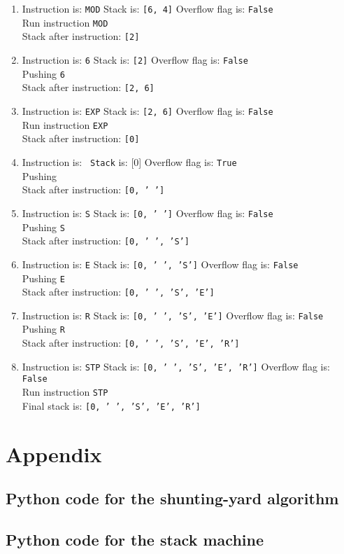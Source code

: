 \begin{enumerate}
\item Instruction is: \texttt{MOD} Stack is: \texttt{[6, 4]} Overflow flag is: \texttt{False}\\
	Run instruction \texttt{MOD}\\
	Stack after instruction:  \texttt{[2]}
\item Instruction is: \texttt{6} Stack is: \texttt{[2]} Overflow flag is: \texttt{False}\\
	Pushing \texttt{6}\\
	Stack after instruction:  \texttt{[2, 6]}
\item Instruction is: \texttt{EXP} Stack is: \texttt{[2, 6]} Overflow flag is: \texttt{False}\\
	Run instruction \texttt{EXP}\\
	Stack after instruction:  \texttt{[0]}
\item Instruction is: \texttt{  Stack} is: [0]\texttt{} Overflow flag is: \texttt{True}\\
	Pushing \texttt{ }\\
	Stack after instruction:  \texttt{[0, ' ']}
\item Instruction is: \texttt{S} Stack is: \texttt{[0, ' ']} Overflow flag is: \texttt{False}\\
	Pushing \texttt{S}\\
	Stack after instruction:  \texttt{[0, ' ', 'S']}
\item Instruction is: \texttt{E} Stack is: \texttt{[0, ' ', 'S']} Overflow flag is: \texttt{False}\\
	Pushing \texttt{E}\\
	Stack after instruction:  \texttt{[0, ' ', 'S', 'E']}
\item Instruction is: \texttt{R} Stack is: \texttt{[0, ' ', 'S', 'E']} Overflow flag is: \texttt{False}\\
	Pushing \texttt{R}\\
	Stack after instruction:  \texttt{[0, ' ', 'S', 'E', 'R']}
\item Instruction is: \texttt{STP} Stack is: \texttt{[0, ' ', 'S', 'E', 'R']} Overflow flag is: \texttt{False}\\
	Run instruction \texttt{STP}\\
Final stack is:  \texttt{[0, ' ', 'S', 'E', 'R']}
\end{enumerate}




\section*{Appendix}
\subsection*{Python code for the shunting-yard algorithm}

\subsection*{Python code for the stack machine}


